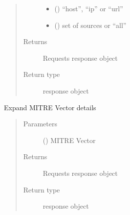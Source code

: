 \documentclass[letterpaper,10pt,english]{sphinxmanual}
\begin{document}
\begin{fulllineitems}
\begin{fulllineitems}
\begin{quote}
\begin{description}
\begin{itemize}
\item {} 
\sphinxAtStartPar
{} () \textendash{} “host”, “ip” or “url”

\item {} 
\sphinxAtStartPar
{} () \textendash{} set of sources or “all”

\end{itemize}

\item[{Returns}] \leavevmode
\sphinxAtStartPar
Requests response object

\item[{Return type}] \leavevmode
\sphinxAtStartPar
response object

\end{description}\end{quote}

\end{fulllineitems}


\begin{fulllineitems}
\label{\detokenize{b1td-class:bloxone.b1td.expand_mitre_vector}}
\sphinxAtStartPar
Expand MITRE Vector details
\begin{quote}\begin{description}
\item[{Parameters}] \leavevmode
\sphinxAtStartPar
{} () \textendash{} MITRE Vector

\item[{Returns}] \leavevmode
\sphinxAtStartPar
Requests response object

\item[{Return type}] \leavevmode
\sphinxAtStartPar
response object

\end{description}\end{quote}

\end{fulllineitems}



\end{fulllineitems}
\end{document}

